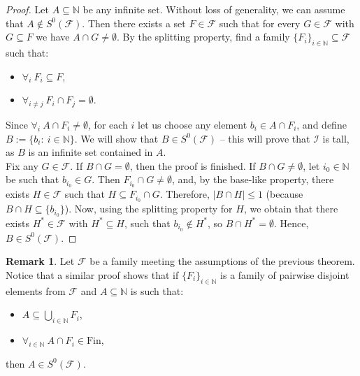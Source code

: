 \documentclass{amsart}
\theoremstyle{definition}
\newtheorem{remark}[thm]{Remark}
\theoremstyle{definition}
\newcommand{\N}{{\mathbb N}}
\newcommand{\Fin}{\textrm{Fin}}
\newcommand{\I}{\mathcal I}
\newcommand{\calK}{\mathcal{K}}
\newcommand{\MB}{S^0}  %
\begin{document}
\begin{proof}
Let $A \subseteq\N$ be any infinite set. 
Without loss of generality, we can assume that $A\notin \MB(\mathcal{F})$. Then there exists a set $F\in\mathcal{F}$ such that for every $G\in\mathcal{F}$ with $G\subseteq F$ we have $A\cap G \neq\emptyset$. By the splitting property, find a family $\{F_i\}_{i\in\N} \subseteq\mathcal{F}$ such that:
\begin{itemize}
\item $\forall_{i}\ F_i \subseteq F$,
\item $\forall_{i\neq j}\ F_i\cap F_j =\emptyset$.
\end{itemize}
Since $\forall_{i}\ A\cap F_i \neq\emptyset$, for each $i$ let us choose any element $b_i \in A\cap F_i$, and define $B:=\{b_i :\ i\in\N\}$. We will show that $B\in\MB(\mathcal{F})$ -- this will prove that $\I$ is tall, as $B$ is an infinite set contained in $A$.\\
Fix any $G\in \mathcal{F}$. If $B\cap G=\emptyset$, then the proof is finished. If $B\cap G \neq\emptyset$, let $i_0\in\N$ be such that $b_{i_0}\in G$. Then $F_{i_0}\cap G \neq\emptyset$, and, by the base-like property,
there exists $H\in\mathcal{F}$ such that $H\subseteq F_{i_0}\cap G$. Therefore, $|B\cap H|\leq 1$ (because $B\cap H\subseteq\{b_{i_0}\}$). Now, using the splitting property for $H$, we obtain that there exists $H^*\in\mathcal{F}$ with $H^*\subseteq H$, such that $b_{i_0}\notin H^*$, so $B\cap H^* =\emptyset$. Hence, $B\in\MB(\mathcal{F})$.
%
\end{proof}

\begin{remark}\label{remtall+}
Let $\mathcal{F}$ be a family meeting the assumptions of the previous theorem.
Notice that a similar proof shows that if $\{F_i\}_{i\in\N}$ is a family of pairwise disjoint elements from $\mathcal{F}$ and $A\subseteq \N$ is such that:
\begin{itemize}
	\item $A\subseteq \bigcup_{i\in\N}{F_i}$,
	\item $\forall_{i\in\N}\ A\cap F_i\in\Fin$,
\end{itemize}
then $A\in\MB(\mathcal{F})$.
\end{remark}
\end{document}
